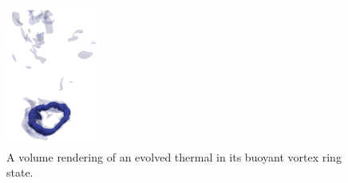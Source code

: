 \documentclass[12pt]{article}
\begin{document}
\begin{figure}
	\begin{center}
	\vspace{-10pt}
    \includegraphics[width=0.28\textwidth]{./figs/turbulent_thermal.png}
	\vspace{-16pt}
	\end{center}
    \caption{ A volume rendering of an evolved thermal in its buoyant vortex ring state.
	\label{fig:massive_star} }
\end{figure}



\end{document}
